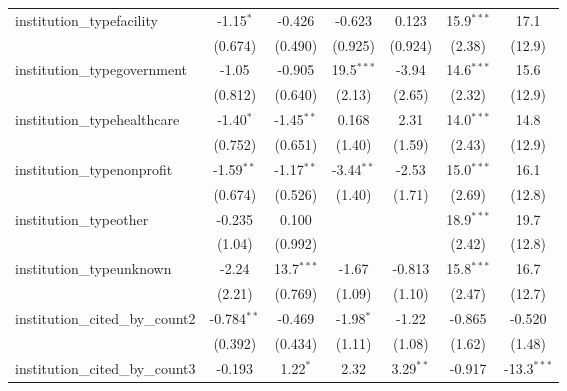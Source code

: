 \begin{tabular}{lcccccc}
   institution\_typefacility             & -1.15$^{*}$   & -0.426        & -0.623        & 0.123         & 15.9$^{***}$  & 17.1\\   
                                         & (0.674)       & (0.490)       & (0.925)       & (0.924)       & (2.38)        & (12.9)\\   
   institution\_typegovernment           & -1.05         & -0.905        & 19.5$^{***}$  & -3.94         & 14.6$^{***}$  & 15.6\\   
                                         & (0.812)       & (0.640)       & (2.13)        & (2.65)        & (2.32)        & (12.9)\\   
   institution\_typehealthcare           & -1.40$^{*}$   & -1.45$^{**}$  & 0.168         & 2.31          & 14.0$^{***}$  & 14.8\\   
                                         & (0.752)       & (0.651)       & (1.40)        & (1.59)        & (2.43)        & (12.9)\\   
   institution\_typenonprofit            & -1.59$^{**}$  & -1.17$^{**}$  & -3.44$^{**}$  & -2.53         & 15.0$^{***}$  & 16.1\\   
                                         & (0.674)       & (0.526)       & (1.40)        & (1.71)        & (2.69)        & (12.8)\\   
   institution\_typeother                & -0.235        & 0.100         &               &               & 18.9$^{***}$  & 19.7\\   
                                         & (1.04)        & (0.992)       &               &               & (2.42)        & (12.8)\\   
   institution\_typeunknown              & -2.24         & 13.7$^{***}$  & -1.67         & -0.813        & 15.8$^{***}$  & 16.7\\   
                                         & (2.21)        & (0.769)       & (1.09)        & (1.10)        & (2.47)        & (12.7)\\   
   institution\_cited\_by\_count2        & -0.784$^{**}$ & -0.469        & -1.98$^{*}$   & -1.22         & -0.865        & -0.520\\   
                                         & (0.392)       & (0.434)       & (1.11)        & (1.08)        & (1.62)        & (1.48)\\   
   institution\_cited\_by\_count3        & -0.193        & 1.22$^{*}$    & 2.32          & 3.29$^{**}$   & -0.917        & -13.3$^{***}$\\   

\end{tabular}
